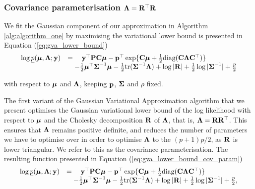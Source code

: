 \subsubsection{Covariance parameterisation ${\boldsymbol \Lambda} = {\bf R}^\top {\bf R}$}

We fit the Gaussian component of our approximation in Algorithm \ref{alg:algorithm_one} by maximising  the
variational lower bound is presented in Equation (\ref{eq:gva_lower_bound})
\begin{equation}
\label{eq:gva_lower_bound}
\begin{array}{ll}
	\log \underline{p}({\boldsymbol \mu}, {\boldsymbol \Lambda}; {\bf y}) & = \quad {\bf y}^\top{\bf P} {\bf C} {\boldsymbol\mu} - {\bf p}^\top \exp\{{\bf C} {\boldsymbol \mu} + \tfrac{1}{2} \text{diag}({\bf C} {\boldsymbol \Lambda} {\bf C}^\top)\} \\
	& \quad - \tfrac{1}{2} {\boldsymbol \mu}^\top {\boldsymbol\Sigma}^{-1} {\boldsymbol \mu} - \tfrac{1}{2} \text{tr}{({\boldsymbol\Sigma}^{-1} {\boldsymbol\Lambda})} + \log{|{\bf R}|}
	                                        + \tfrac{1}{2} \log{|{\boldsymbol\Sigma}^{-1}|}  + \tfrac{p}{2}
\end{array}
\end{equation}

\noindent with respect to ${\boldsymbol \mu}$ and ${\boldsymbol \Lambda}$, keeping ${\bf p}$, ${\boldsymbol \Sigma}$ and $\rho$ fixed.
		
The first variant of the Gaussian Variational Approximation algorithm that we present optimises the
Gaussian variational lower bound of the log likelihood with respect to ${\boldsymbol \mu}$ and the Cholesky decomposition
${\bf R}$ of ${\boldsymbol \Lambda}$, that is, ${\boldsymbol \Lambda} = {\bf R} {\bf R}^\top$. This ensures that ${\boldsymbol \Lambda}$ remains positive
definite, and reduces the number of parameters we have to optimise over in order to optimise ${\boldsymbol \Lambda}$
to the $(p + 1) p / 2$, as ${\bf R}$ is lower triangular.	We refer to this as the covariance
parameterisation. The resulting function presented in Equation (\ref{eq:gva_lower_bound_cov_param})
\begin{equation}
\label{eq:gva_lower_bound_cov_param}
\begin{array}{ll}
	\log \underline{p}({\boldsymbol \mu}, {\boldsymbol \Lambda}; {\bf y}) & = \quad {\bf y}^\top{\bf P} {\bf C} {\boldsymbol\mu} - {\bf p}^\top \exp\{{\bf C} {\boldsymbol \mu} + \tfrac{1}{2} \text{diag}({\bf C} {\boldsymbol \Lambda} {\bf C}^\top)\} \\
	& \quad - \tfrac{1}{2} {\boldsymbol \mu}^\top {\boldsymbol\Sigma}^{-1} {\boldsymbol \mu} - \tfrac{1}{2} \text{tr}{({\boldsymbol\Sigma}^{-1} {\boldsymbol\Lambda})} + \log{|{\bf R}|}
	                                        + \tfrac{1}{2} \log{|{\boldsymbol\Sigma}^{-1}|} + \tfrac{p}{2},                                                                              
\end{array}
\end{equation}

